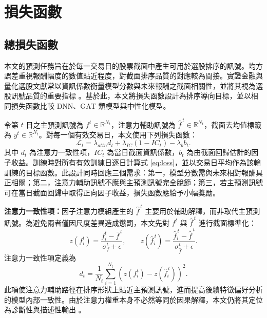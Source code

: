 \section{損失函數}
\label{sec:loss}

\subsection{總損失函數}
本文的預測任務旨在於每一交易日的股票截面中產生可用於選股排序的訊號。均方誤差重視報酬幅度的數值貼近程度，對截面排序品質的對應較為間接。實證金融與量化選股文獻常以資訊係數衡量模型分數與未來報酬之截面相關性，並將其視為選股訊號品質的重要指標 \cite{zhang2020information_coefficient,ding2022timevarying_ic,qian2004active_risk}。基於此，本文將損失函數設計為排序導向目標，並以相同損失函數比較 DNN、GAT 類模型與中性化模型。

令第 \(t\) 日之主預測訊號為 \(f^t\in\mathbb{R}^{N_t}\)，注意力輔助訊號為 \(\widehat{f}^{\,t}\in\mathbb{R}^{N_t}\)，截面去均值標籤為 \(y^t\in\mathbb{R}^{N_t}\)。對每一個有效交易日，本文使用下列損失函數：
\begin{equation}
\mathcal{L}_t
=\lambda_{attn} d_t
+\lambda_{IC}(1-IC_t)
-\lambda_b b_t .
\label{eq:loss}
\end{equation}
其中 \(d_t\) 為注意力一致性項，\(IC_t\) 為當日截面資訊係數，\(b_t\) 為由截面回歸估計的因子收益。訓練時對所有有效訓練日逐日計算式 \ref{eq:loss}，並以交易日平均作為該輪訓練的目標函數。此設計同時回應三個需求：第一，模型分數需與未來相對報酬具正相關；第二，注意力輔助訊號不應與主預測訊號完全脫節；第三，若主預測訊號可在當日截面回歸中取得正向因子收益，損失函數應給予小幅獎勵。

\textbf{注意力一致性項：}因子注意力模組產生的 \(\widehat{f}^{\,t}\) 主要用於輔助解釋，而非取代主預測訊號。為避免兩者僅因尺度差異造成懲罰，本文先對 \(f^t\) 與 \(\widehat{f}^{\,t}\) 進行截面標準化：
\begin{equation}
z(f_i^t)=\frac{f_i^t-\bar{f}^{\,t}}{\sigma_f^t+\epsilon},
\qquad
z(\widehat{f}_i^{\,t})=
\frac{\widehat{f}_i^{\,t}-\bar{\widehat{f}}^{\,t}}
{\sigma_{\widehat{f}}^t+\epsilon}.
\end{equation}
注意力一致性項定義為
\begin{equation}
d_t=\frac{1}{N_t}\sum_{i=1}^{N_t}
\left(z(f_i^t)-z(\widehat{f}_i^{\,t})\right)^2 .
\end{equation}
此項使注意力輔助路徑在排序形狀上貼近主預測訊號，進而提高後續特徵偏好分析的模型內部一致性。由於注意力權重本身不必然等同於因果解釋，本文仍將其定位為診斷性與描述性輸出 \cite{jain2019attention_not_explanation,serrano2019attention_interpretable}。

